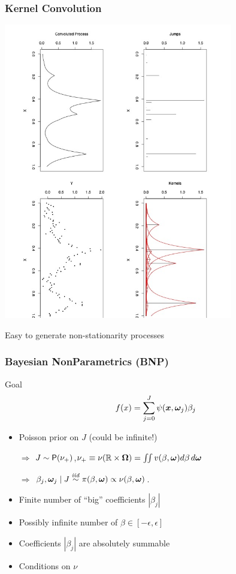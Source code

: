 \documentclass[]{beamer}
\newcommand{\bs}[2]{\begin{frame} \frametitle{#1}
{#2}
\end{frame} }
\begin{document}
\bs{Kernel Convolution } {
    \includegraphics[angle=90,origin=l,totalheight=6.5truecm,
     clip=1, width=10cm]{gammaproc2}

Easy to generate  non-stationarity processes

}







\bs{Bayesian NonParametrics (BNP)}{

Goal $$f(x) = \sum_{j=0}^{J}  \psi(\bm x, \bm \omega_j) \beta_j$$
\pause


\pause

\begin{itemize}
\item Poisson prior on $J$  (could be infinite!)
\item[$\Rightarrow$] $J \sim \mbox{\sf P}(\nu_+)$,\qquad $\nu_+\equiv
  \nu(\mathbb{R}\times\bm \Omega) = \iint v(\beta, \bm \omega) d \beta \,
  d\bm \omega$  \pause
\item[$\Rightarrow$] $\beta_j,\bm \omega_j \mid J \mathrel{\mathop{\sim}\limits^{\mathit{iid}}} \pi(\beta, \bm \omega)
  \propto \nu(\beta,\bm \omega)$. \pause
\end{itemize}

\begin{itemize}
  \item Finite number of ``big'' coefficients $|\beta_j|$ \pause
  \item Possibly infinite number of $\beta \in [-\epsilon, \epsilon]$ \pause
  \item Coefficients $|\beta_j|$ are absolutely summable \pause
  \item Conditions on $\nu$
 \end{itemize}




}
\end{document}

